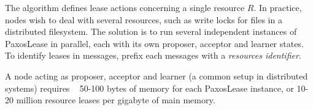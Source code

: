 \documentclass[12pt]{article}
\begin{document}
The algorithm defines lease actions concerning a single resource $R$. In practice, nodes wish to deal with several resources, such as write locks for files in a distributed filesystem. The solution is to run several independent instances of PaxosLease in parallel, each with its own proposer, acceptor and learner states. To identify leases in messages, prefix each messages with a \emph{resources identifier}.

A node acting as proposer, acceptor and learner (a common setup in distributed systems) requires ~ 50-100 bytes of memory for each PaxosLease instance, or 10-20 million resource leases per gigabyte of main memory.
\end{document}

